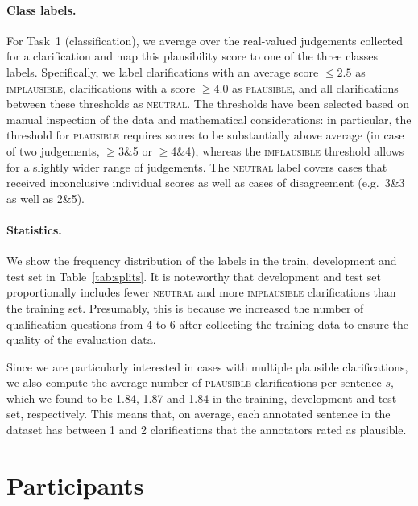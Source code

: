 \documentclass[11pt]{article}
\begin{document}
\paragraph{Class labels.} For Task~1 (classification),
we average over the real-valued judgements collected for a clarification and map this plausibility score to one of the three classes labels. Specifically, we label clarifications with an average score $\leq 2.5$ as \textsc{implausible}, clarifications with a score $\geq 4.0$ as \textsc{plausible}, and all clarifications between these thresholds as \textsc{neutral}. 
The thresholds have been selected based on manual inspection of the data and mathematical considerations: in particular, the threshold for \textsc{plausible} requires scores to be substantially above average (in case of two judgements, $\geq$3\&5 or $\geq$4\&4), whereas the \textsc{implausible} threshold allows for a slightly wider range of judgements. The \textsc{neutral} label covers cases that received inconclusive individual scores as well as cases of disagreement (e.g.~3\&3 as well as 2\&5).

\paragraph{Statistics.} 
We show the frequency distribution of the labels in the train, development and test set in Table~\ref{tab:splits}. 
It is noteworthy that development and test set proportionally includes fewer \textsc{neutral} and more \textsc{implausible} clarifications than the training set. Presumably, this is because we increased the number of qualification questions from 4 to 6 after collecting the training data to ensure the quality of the evaluation data.

Since we are particularly interested in cases with multiple plausible clarifications, we also compute the average number of \textsc{plausible} clarifications per sentence $s$, which we found to be 1.84, 1.87 and 1.84 in the training, development and test set, respectively. This means that, on average, each annotated sentence in the dataset has between 1 and 2 clarifications that the annotators rated as plausible.


\section{Participants}
\label{sec:participants}
\end{document}
